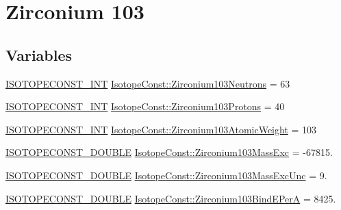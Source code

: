 \hypertarget{group___isotope_const-_zirconium-_zr103}{}\section{Zirconium 103}
\label{group___isotope_const-_zirconium-_zr103}
\subsection*{Variables}
\begin{DoxyCompactItemize}
\item 
\mbox{\hyperlink{group___isotope_const-_macros_ga5f18360b3e99483a35c32d789e62621c}{I\+S\+O\+T\+O\+P\+E\+C\+O\+N\+S\+T\+\_\+\+I\+NT}} \mbox{\hyperlink{group___isotope_const-_zirconium-_zr103_ga2443556d1f026eaa4d359b49840ab637}{Isotope\+Const\+::\+Zirconium103\+Neutrons}} = 63
\item 
\mbox{\hyperlink{group___isotope_const-_macros_ga5f18360b3e99483a35c32d789e62621c}{I\+S\+O\+T\+O\+P\+E\+C\+O\+N\+S\+T\+\_\+\+I\+NT}} \mbox{\hyperlink{group___isotope_const-_zirconium-_zr103_gab8601dfc63d83d7c7dc45fa18e1f9668}{Isotope\+Const\+::\+Zirconium103\+Protons}} = 40
\item 
\mbox{\hyperlink{group___isotope_const-_macros_ga5f18360b3e99483a35c32d789e62621c}{I\+S\+O\+T\+O\+P\+E\+C\+O\+N\+S\+T\+\_\+\+I\+NT}} \mbox{\hyperlink{group___isotope_const-_zirconium-_zr103_gaa7d4d8238d6399e00438c561988d05a8}{Isotope\+Const\+::\+Zirconium103\+Atomic\+Weight}} = 103
\item 
\mbox{\hyperlink{group___isotope_const-_macros_ga8f45a7272ce02c0b4c65c44636ed719a}{I\+S\+O\+T\+O\+P\+E\+C\+O\+N\+S\+T\+\_\+\+D\+O\+U\+B\+LE}} \mbox{\hyperlink{group___isotope_const-_zirconium-_zr103_ga9ee5e59b17167dad78724f065d7a8c5f}{Isotope\+Const\+::\+Zirconium103\+Mass\+Exc}} = -\/67815.
\item 
\mbox{\hyperlink{group___isotope_const-_macros_ga8f45a7272ce02c0b4c65c44636ed719a}{I\+S\+O\+T\+O\+P\+E\+C\+O\+N\+S\+T\+\_\+\+D\+O\+U\+B\+LE}} \mbox{\hyperlink{group___isotope_const-_zirconium-_zr103_ga45344967aed26c54bea7a59e530e5540}{Isotope\+Const\+::\+Zirconium103\+Mass\+Exc\+Unc}} = 9.
\item 
\mbox{\hyperlink{group___isotope_const-_macros_ga8f45a7272ce02c0b4c65c44636ed719a}{I\+S\+O\+T\+O\+P\+E\+C\+O\+N\+S\+T\+\_\+\+D\+O\+U\+B\+LE}} \mbox{\hyperlink{group___isotope_const-_zirconium-_zr103_ga5c35c42290a7c03660edef94a388ff4d}{Isotope\+Const\+::\+Zirconium103\+Bind\+E\+PerA}} = 8425.
\item 

\end{DoxyCompactItemize}
